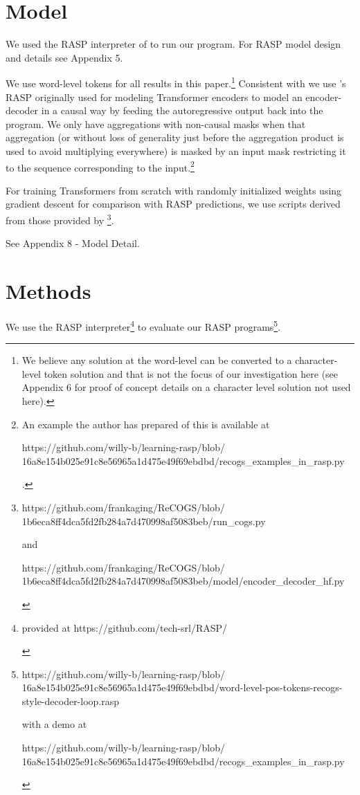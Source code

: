 \documentclass[11pt]{article}
\begin{document}
\section{Model}
We used the RASP interpreter of \cite{Weiss2021} to run our program. For RASP model design and details see Appendix 5.

We use word-level tokens for all results in this paper.\footnote{We believe any solution at the word-level can be converted to a character-level token solution and that is not the focus of our investigation here (see Appendix 6 for proof of concept details on a character level solution not used here).}
Consistent with \cite{Zhou2024} we use \cite{Weiss2021}'s RASP originally used for modeling Transformer encoders to model an encoder-decoder in a causal way by feeding the autoregressive output back into the program. We only have aggregations with non-causal masks when that aggregation (or without loss of generality just before the aggregation product is used to avoid multiplying everywhere) is masked by an input mask restricting it to the sequence corresponding to the input.\footnote{An example the author has prepared of this is available at 
\begin{tiny}
https://github.com/willy-b/learning-rasp/blob/
16a8e154b025e91c8e56965a1d475e49f69ebdbd/recogs\_examples\_in\_rasp.py 
\end{tiny}
.}

For training Transformers from scratch with randomly initialized weights using gradient descent for comparison with RASP predictions, we use scripts derived from those provided by \cite{Wu2023}\footnote{
\begin{tiny}
https://github.com/frankaging/ReCOGS/blob/
1b6eca8ff4dca5fd2fb284a7d470998af5083beb/run\_cogs.py

and

https://github.com/frankaging/ReCOGS/blob/
1b6eca8ff4dca5fd2fb284a7d470998af5083beb/model/encoder\_decoder\_hf.py 
\end{tiny}
}.


See Appendix 8 - Model Detail.
\section{Methods}
We use the RASP \cite{Weiss2021} interpreter\footnote{
\begin{tiny}
provided at https://github.com/tech-srl/RASP/
\end{tiny}
} to evaluate our RASP programs\footnote{
\begin{tiny}
https://github.com/willy-b/learning-rasp/blob/
16a8e154b025e91c8e56965a1d475e49f69ebdbd/word-level-pos-tokens-recogs-style-decoder-loop.rasp

with a demo at

https://github.com/willy-b/learning-rasp/blob/
16a8e154b025e91c8e56965a1d475e49f69ebdbd/recogs\_examples\_in\_rasp.py 
\end{tiny}
}.
\end{document}
